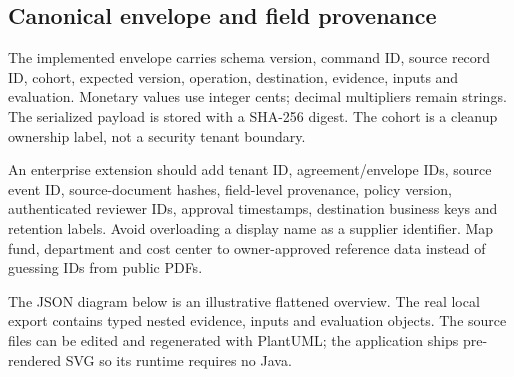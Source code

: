 \documentclass[11pt,letterpaper]{article}
\begin{document}
\subsection{Canonical envelope and field provenance}
The implemented envelope carries schema version, command ID, source record ID, cohort, expected version, operation, destination, evidence, inputs and evaluation. Monetary values use integer cents; decimal multipliers remain strings. The serialized payload is stored with a SHA-256 digest. The cohort is a cleanup ownership label, not a security tenant boundary.

An enterprise extension should add tenant ID, agreement/envelope IDs, source event ID, source-document hashes, field-level provenance, policy version, authenticated reviewer IDs, approval timestamps, destination business keys and retention labels. Avoid overloading a display name as a supplier identifier. Map fund, department and cost center to owner-approved reference data instead of guessing IDs from public PDFs.

The JSON diagram below is an illustrative flattened overview. The real local export contains typed nested evidence, inputs and evaluation objects. The source files can be edited and regenerated with PlantUML; the application ships pre-rendered SVG so its runtime requires no Java.
\end{document}
